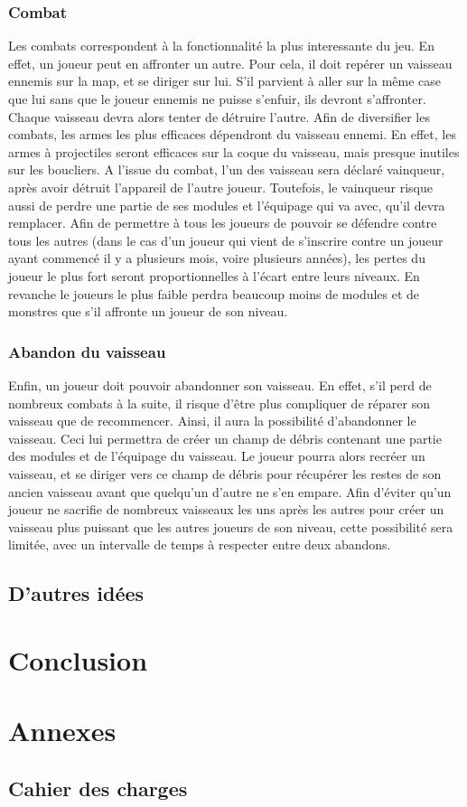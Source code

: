\documentclass[a4paper,11pt]{report}
\begin{document}
    \subsection{Combat}
      Les combats correspondent à la fonctionnalité la plus interessante du jeu. En effet, un joueur peut en affronter un autre.
      Pour cela, il doit repérer un vaisseau ennemis sur la map, et se diriger sur lui. 
      S'il parvient à aller sur la même case que lui sans que le joueur ennemis ne puisse s'enfuir, ils devront s'affronter.
      Chaque vaisseau devra alors tenter de détruire l'autre. Afin de diversifier les combats, les armes les plus efficaces dépendront du vaisseau ennemi.
      En effet, les armes à projectiles seront efficaces sur la coque du vaisseau, mais presque inutiles sur les boucliers.
      A l'issue du combat, l'un des vaisseau sera déclaré vainqueur, après avoir détruit l'appareil de l'autre joueur. 
      Toutefois, le vainqueur risque aussi de perdre une partie de ses modules et l'équipage qui va avec, qu'il devra remplacer.
      Afin de permettre à tous les joueurs de pouvoir se défendre contre tous les autres (dans le cas d'un joueur qui vient de s'inscrire contre un joueur ayant commencé il y a plusieurs mois, voire plusieurs années), les pertes du joueur le plus fort seront proportionnelles à l'écart entre leurs niveaux.
      En revanche le joueurs le plus faible perdra beaucoup moins de modules et de monstres que s'il affronte un joueur de son niveau.
      
    \subsection{Abandon du vaisseau}
      Enfin, un joueur doit pouvoir abandonner son vaisseau. 
      En effet, s'il perd de nombreux combats à la suite, il risque d'être plus compliquer de réparer son vaisseau que de recommencer.
      Ainsi, il aura la possibilité d'abandonner le vaisseau. Ceci lui permettra de créer un champ de débris contenant une partie des modules et de l'équipage du vaisseau.
      Le joueur pourra alors recréer un vaisseau, et se diriger vers ce champ de débris pour récupérer les restes de son ancien vaisseau avant que quelqu'un d'autre ne s'en empare.
      Afin d'éviter qu'un joueur ne sacrifie de nombreux vaisseaux les uns après les autres pour créer un vaisseau plus puissant que les autres joueurs de son niveau, cette possibilité sera limitée, avec un intervalle de temps à respecter entre deux abandons.
      
  \section{D'autres idées}

\chapter{Conclusion}

\chapter{Annexes}

  \section{Cahier des charges}
    
\end{document}
